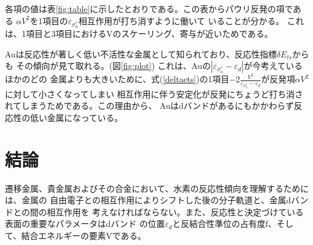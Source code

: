 \documentclass[12pt]{ltjsarticle}
\begin{document}
各項の値は表\ref{fig:table}に示したとおりである。この表からパウリ反発の項である
$\alpha V^2$を1項目の$\varepsilon _{\sigma_u^*}$相互作用が打ち消すように働いて
いることが分かる。
これは、1項目と3項目におけるVのスケーリング、寄与が近いためである。

Auは反応性が著しく低い不活性な金属として知られており、反応性指標$\delta E_{ts}$からも
その傾向が見て取れる。(図\ref{fig:plot})
これは、Auの$| \varepsilon _{\sigma_u^*} - \varepsilon _d|$が今考えているほかのどの
金属よりも大きいために、式(\ref{deltaets})の1項目$-2 \frac{ V^2 }{\varepsilon _
{\sigma_u^*} - \varepsilon _d}$が反発項$\alpha V^2$に対して小さくなってしまい
相互作用に伴う安定化が反発にちょうど打ち消されてしまうためである。この理由から、
Auはdバンドがあるにもかかわらず反応性の低い金属になっている。

\section{結論}
遷移金属、貴金属およびその合金において、水素の反応性傾向を理解するためには、金属の
自由電子との相互作用によりシフトした後の分子軌道と、金属dバンドとの間の相互作用を
考えなければならない。また、反応性と決定づけている表面の重要なパラメータはdバンド
の位置$\varepsilon_d$と反結合性準位の占有度f、そして、結合エネルギーの要素Vである。
\end{document}
